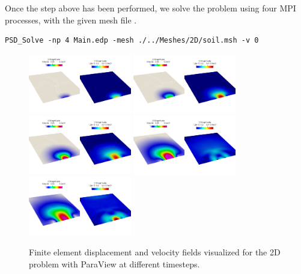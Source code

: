 {{Once the step above has been performed, we solve the problem using four MPI processes, with the given mesh file . 

\begin{lstlisting}[style=BashInputStyle]
	PSD_Solve -np 4 Main.edp -mesh ./../Meshes/2D/soil.msh -v 0
\end{lstlisting}


\begin{figure}[h!]
	\centering
	\includegraphics[width=0.4\textwidth]{./Images/sd-u0.png}
	\includegraphics[width=0.4\textwidth]{./Images/sd-u1.png}\\
	\includegraphics[width=0.4\textwidth]{./Images/sd-u2.png}
	\includegraphics[width=0.4\textwidth]{./Images/sd-u3.png}\\
	\includegraphics[width=0.4\textwidth]{./Images/sd-u4.png}
	\caption{Finite element displacement and velocity fields visualized for the 2D problem with ParaView at different timesteps. \label{bar-sd}}
\end{figure}

}}
